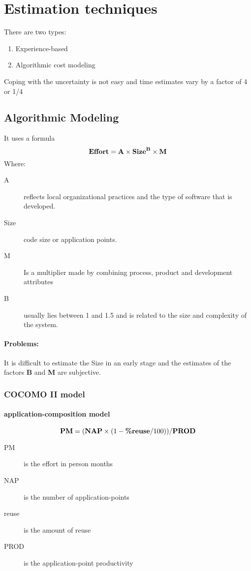 \documentclass[a4paper,11pt,twocolumn]{report}
\begin{document}
    \section{Estimation techniques}
    There are two types:
    \begin{enumerate}
        \item Experience-based
        \item Algorithmic cost modeling
    \end{enumerate}
    Coping with the uncertainty is not easy and time estimates vary by a factor
    of 4 or 1/4 
    \subsection{Algorithmic Modeling}
    It uses a formula
    \begin{displaymath}\mbox{\textbf{Effort}} = \textbf{A}\times
        \mbox{\textbf{Size}}^\textbf{B}\times \textbf{M}\end{displaymath}
    Where:
    \begin{description}
        \item[A] reflects local organizational practices and the type of
            software that is developed.
        \item[Size] code size or application points.
        \item[M] Is a multiplier made by combining process, product and
            development attributes
        \item[B]usually lies between 1 and 1.5 and is related to the size and
            complexity of the system.
    \end{description}
    \paragraph{Problems:}
    It is difficult to estimate the Size in an early stage and the estimates of
    the factors \textbf{B} and \textbf{M} are subjective.
    \subsubsection{COCOMO II model}
    \paragraph{application-composition model}
    \begin{displaymath}\mbox{\textbf{PM}}=(\mbox{\textbf{NAP}}\times
        (1-\mbox{\textbf{\%reuse}}/100))/\mbox{\textbf{PROD}}\end{displaymath}
    \begin{description}
        \item[PM] is the effort in person months
        \item[NAP] is the number of application-points
        \item[reuse] is the amount of reuse
        \item[PROD] is the application-point productivity
    \end{description}
\end{document}
